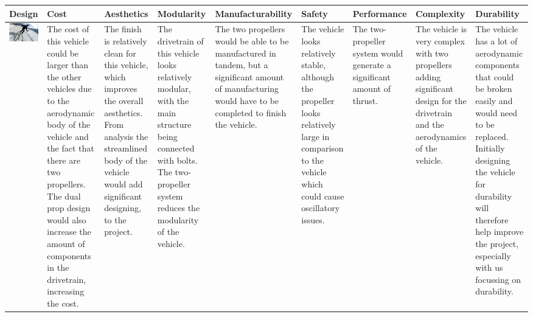 \onecolumn
\newcommand\x{3.5cm} %
\begin{table}[p]
    \centering
    \begin{tabular}{|m{5cm}|m{\x}|m{\x}|m{\x}|m{\x}|m{\x}|m{\x}|m{\x}|m{\x}|}
      \hline
      \textbf{Design} &
      \textbf{Cost} &
      \textbf{Aesthetics} &
      \textbf{Modularity} &
      \textbf{Manufacturability} &
      \textbf{Safety} &
      \textbf{Performance} &
      \textbf{Complexity} &
      \textbf{Durability} 
      \\ \hline
      
      \includegraphics[width=\linewidth]{images/placeholder.jpg}
      &
      The cost of this vehicle could be larger than the other vehicles due to the aerodynamic body of the vehicle and the fact that there are two propellers. The dual prop design would also increase the amount of components in the drivetrain, increasing the cost.
      & 
      The finish is relatively clean for this vehicle, which improves the overall aesthetics. From analysis the streamlined body of the vehicle would add significant designing, to the project. 
      &  
      The drivetrain of this vehicle looks relatively modular, with the main structure being connected with bolts. The two-propeller system reduces the modularity of the vehicle.
      & 
      The two propellers would be able to be manufactured in tandem, but a significant amount of manufacturing would have to be completed to finish the vehicle.  
      &  
      The vehicle looks relatively stable, although the propeller looks relatively large in comparison to the vehicle which could cause oscillatory issues.
      &  
      The two-propeller system would generate a significant amount of thrust. 
      &  
      The vehicle is very complex with two propellers adding significant design for the drivetrain and the aerodynamics of the vehicle. 
      &  
      The vehicle has a lot of aerodynamic components that could be broken easily and would need to be replaced. Initially designing the vehicle for durability will therefore help improve the project, especially with us focussing on durability.
      \\ \hline
      

\end{tabular}
\end{table}
